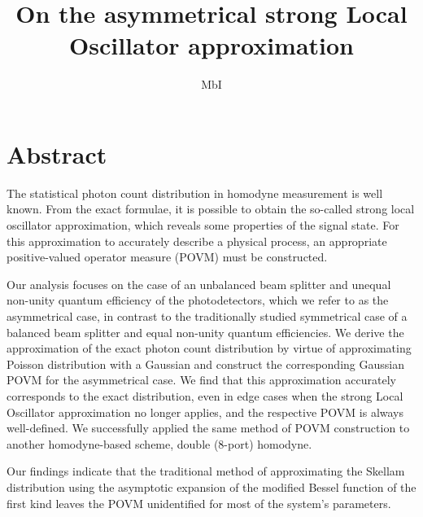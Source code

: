 \documentclass[]{article}
\title{On the asymmetrical strong Local Oscillator approximation} %
\author{MbI}
\begin{document}
\maketitle
\section{Abstract}
The statistical photon count distribution in homodyne measurement is well known. From the exact formulae, it is possible to obtain the so-called strong local oscillator approximation, which reveals some properties of the signal state. For this approximation to accurately describe a physical process, an appropriate positive-valued operator measure (POVM) must be constructed.

Our analysis focuses on the case of an unbalanced beam splitter and unequal non-unity quantum efficiency of the photodetectors, which we refer to as the asymmetrical case, in contrast to the traditionally studied symmetrical case of a balanced beam splitter and equal non-unity quantum efficiencies. We derive {the} approximation {of the exact photon count distribution by virtue of approximating Poisson distribution with a Gaussian} and construct the corresponding Gaussian POVM for the asymmetrical case. {We find that this approximation accurately corresponds to the exact distribution, even in edge cases when the strong Local Oscillator approximation no longer applies, and the respective POVM is always well-defined. We successfully applied the same method of POVM construction to another homodyne-based scheme, double (8-port) homodyne.}

Our findings indicate that the traditional method of approximating the Skellam distribution using the asymptotic expansion of the modified Bessel function of the first kind leaves the POVM unidentified for most of the system's parameters.
\end{document}
